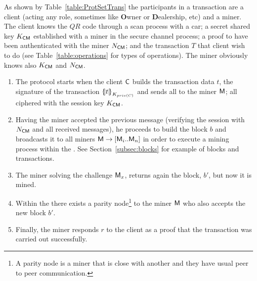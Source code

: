 As shown by Table~\ref{table:ProtSetTrans} the participants in a transaction 
are a client (acting any role, sometimes like \textbf{O}wner or \textbf{D}ealership, etc) and a miner.
The client knows the $QR$ code through a scan process with
a car; a secret shared key $K_{\textsf{C}\textsf{M}}$ established with
a miner in the secure channel process; a proof to have been authenticated
with the miner $N_{\textsf{C}\textsf{M}}$; and the transaction $T$ that client wish 
to do  (see Table~\ref{table:operations} for types of operations). 
The miner obviously knows also $K_{\textsf{C}\textsf{M}}$ and $N_{\textsf{C}\textsf{M}}$. 
\begin{enumerate}
    \item The protocol starts when the client $\textsf{C}$ builds the transaction 
        data $t$, the signature of the transaction $\fat{t}_{K_{priv(C)}}$ and sends
        all to the miner $\textsf{M}$; all ciphered with the 
        session key $K_{\textsf{C}\textsf{M}}$. 
    \item Having the miner accepted the previous message (verifying the  
        session with $N_{\textsf{C}\textsf{M}}$ and all received messages), he proceeds to build 
        the block $b$ and broadcasts it to all miners $\textsf{M}\rightarrow [\textsf{M}_i .. \textsf{M}_n]$
        in order to execute a mining process within the \blockchaincarnetwork.
        See Section~\ref{subsec:blocks} for example of blocks and transactions.

        
    \item The miner solving the challenge $\textsf{M}_x$, returns again the block, $b'$, 
        but now it is mined. 
    \item Within the \blockchaincarnetwork there exists a parity node\footnote{
            A parity node is a miner that is close with another and they have usual
            peer to peer communication.
        } to the miner $\textsf{M}$
        who also accepts the new block $b'$.
    \item Finally, the miner responds $r$ to the client as a proof that the transaction 
        was carried out successfully.
\end{enumerate}


